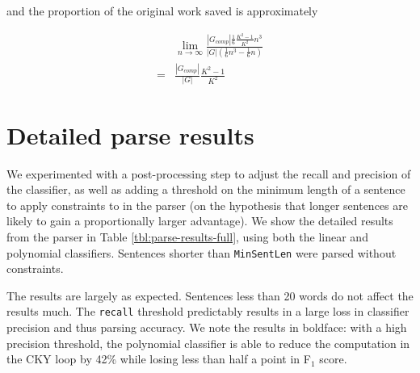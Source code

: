 \documentclass[11pt]{article}
\begin{document}
and the proportion of the original work saved is approximately

\begin{equation*}
\begin{split}
& \lim_{n \to \infty}\frac{|G_{comp}|\frac{1}{6}\frac{K^2-1}{K^2}n^3}{|G|(\frac{1}{6}n^3 - \frac{1}{6}n)}\\
=& \frac{|G_{comp}|}{|G|}\frac{K^2-1}{K^2}
\end{split}
\end{equation*}


\section{Detailed parse results}
\label{sec:parse-results-full}
\label{sec-8-2}

We experimented with a post-processing step to adjust the recall and precision of the classifier, as well as
adding a threshold on the minimum length of a sentence to apply constraints to in the parser (on the hypothesis
that longer sentences are likely to gain a proportionally larger advantage). We show the detailed results from
the parser in Table \ref{tbl:parse-results-full}, using both the linear and polynomial classifiers. Sentences
shorter than \texttt{MinSentLen} were parsed without constraints.

The results are largely as expected. Sentences less than 20 words do not affect the results much. The \texttt{recall} threshold
predictably results in a large loss in classifier precision and thus parsing accuracy. We note the results in
boldface: with a high precision threshold, the polynomial classifier is able to reduce the computation in the CKY loop
by 42\% while losing less than half a point in F$_{\text{1}}$ score.
\end{document}
